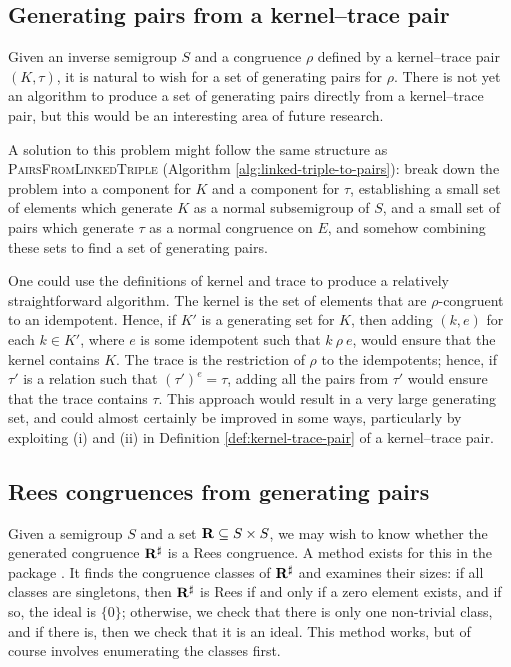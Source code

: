\subsection{Generating pairs from a kernel--trace pair}
\label{sec:kertr-to-pairs}
Given an inverse semigroup $S$ and a congruence $\rho$ defined by a kernel--trace
pair $(K, \tau)$, it is natural to wish for a set of generating pairs for
$\rho$.  There is not yet an algorithm to produce a set of generating pairs
directly from a kernel--trace pair, but this would be an interesting area of
future research.

A solution to this problem might follow the same structure as
\textsc{PairsFromLinkedTriple} (Algorithm
\ref{alg:linked-triple-to-pairs}): break down the problem into a component for
$K$ and a component for $\tau$, establishing a small set of elements which
generate $K$ as a normal subsemigroup of $S$, and a small set of pairs which
generate $\tau$ as a normal congruence on $E$, and somehow combining these sets
to find a set of generating pairs.

One could use the definitions of kernel and trace to produce a relatively
straightforward algorithm.  The kernel is the set of elements that are
$\rho$-congruent to an idempotent.  Hence, if $K'$ is a generating set for $K$,
then adding $(k,e)$ for each $k \in K'$, where $e$ is some idempotent such that
$k ~\rho~ e$, would ensure that the kernel contains $K$.  The trace is the
restriction of $\rho$ to the idempotents; hence, if $\tau'$ is a relation
such that $(\tau')^e = \tau$, adding all the pairs from $\tau'$ would
ensure that the trace contains $\tau$.  This approach would result in a very
large generating set, and could almost certainly be improved in some ways,
particularly by exploiting (i) and (ii) in Definition \ref{def:kernel-trace-pair}
of a kernel--trace pair.

\subsection{Rees congruences from generating pairs}
\label{sec:pairs-to-rees}
Given a semigroup $S$ and a set $\mathbf{R} \subseteq S \times S$, we may wish to know
whether the generated congruence $\mathbf{R}^\sharp$ is a Rees congruence.  A method exists
for this in the \Semigroups{} package \cite{semigroups}.  It finds the congruence
classes of $\mathbf{R}^\sharp$ and examines their sizes: if all classes are singletons, then
$\mathbf{R}^\sharp$ is Rees if and only if a zero element exists, and if so, the ideal is
$\{0\}$; otherwise, we check that there is only one non-trivial class, and if
there is, then we check that it is an ideal.  This method works, but of course
involves enumerating the classes first.


